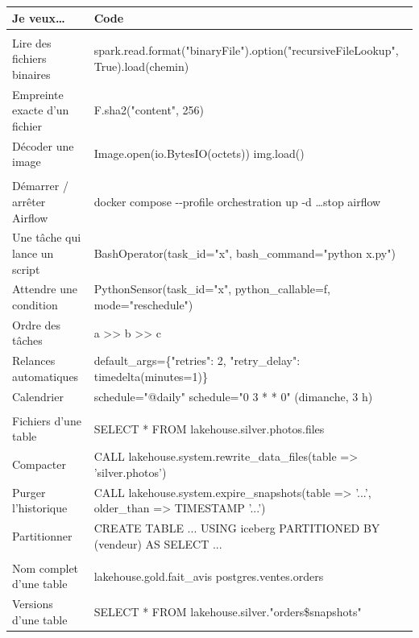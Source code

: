 \begin{center}
\small
\renewcommand{\arraystretch}{1.22}
\begin{tabularx}{\textwidth}{@{}>{\raggedright\arraybackslash}p{4.1cm} >{\raggedright\arraybackslash\ttfamily\footnotesize}X@{}}
\toprule
\normalfont\textbf{Je veux\dots} & \normalfont\textbf{Code} \\
\midrule
\multicolumn{2}{@{}l}{\textbf{\textcolor{lhblue}{Fichiers et images}}} \\
Lire des fichiers binaires & spark.read.format("binaryFile").option("recursiveFileLookup", True).load(chemin) \\
Empreinte exacte d'un fichier & F.sha2("content", 256) \\
Décoder une image & Image.open(io.BytesIO(octets)) \quad img.load() \\
\midrule
\multicolumn{2}{@{}l}{\textbf{\textcolor{lhblue}{Airflow}}} \\
Démarrer / arrêter Airflow & docker compose -{}-profile orchestration up -d \quad \dots stop airflow \\
Une tâche qui lance un script & BashOperator(task\_id="x", bash\_command="python x.py") \\
Attendre une condition & PythonSensor(task\_id="x", python\_callable=f, mode="reschedule") \\
Ordre des tâches & a >{}> b >{}> c \\
Relances automatiques & default\_args=\{"retries": 2, "retry\_delay": timedelta(minutes=1)\} \\
Calendrier & schedule="@daily" \quad schedule="0 3 * * 0" \textrm{(dimanche, 3 h)} \\
\midrule
\multicolumn{2}{@{}l}{\textbf{\textcolor{lhblue}{Iceberg}}} \\
Fichiers d'une table & SELECT * FROM lakehouse.silver.photos.files \\
Compacter & CALL lakehouse.system.rewrite\_data\_files(table => 'silver.photos') \\
Purger l'historique & CALL lakehouse.system.expire\_snapshots(table => '...', older\_than => TIMESTAMP '...') \\
Partitionner & CREATE TABLE ... USING iceberg PARTITIONED BY (vendeur) AS SELECT ... \\
\midrule
\multicolumn{2}{@{}l}{\textbf{\textcolor{lhblue}{Trino}}} \\
Nom complet d'une table & lakehouse.gold.fait\_avis \quad postgres.ventes.orders \\
Versions d'une table & SELECT * FROM lakehouse.silver."orders\$snapshots" \\

\end{tabularx}
\end{center}
